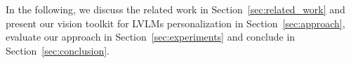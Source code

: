In the following, we discuss the related work in Section~\ref{sec:related_work} and present our vision toolkit for LVLMs personalization in Section~\ref{sec:approach}, evaluate our approach in Section~\ref{sec:experiments} and conclude in Section~\ref{sec:conclusion}.















